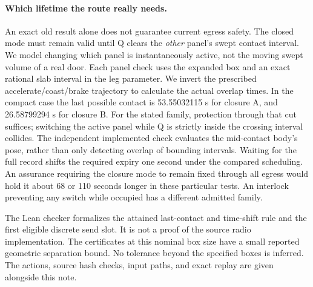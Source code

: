 \documentclass{article}
\begin{document}
\paragraph{Which lifetime the route really needs.}
An exact old result alone does not guarantee current egress
safety. The closed mode must remain valid until Q clears the
\emph{other} panel's swept contact interval. We model changing
which panel is instantaneously active, not the moving swept
volume of a real door. Each panel check uses the expanded
box and an exact rational slab interval in the leg parameter.
We invert the prescribed accelerate/coast/brake trajectory
to calculate the actual overlap times. In the compact case
the last possible contact is 53.55032115 s for closure A,
and 26.58799294 s for closure B. For the stated family,
protection through that cut suffices; switching the active
panel while Q is strictly inside the crossing interval
collides. The independent implemented check evaluates the
mid-contact body's pose, rather than only detecting overlap
of bounding intervals. Waiting for the full record shifts the
required expiry one second under the compared scheduling.
An assurance requiring the closure mode to remain fixed
through all egress would hold it about 68 or 110 seconds
longer in these particular tests. An interlock preventing
any switch while occupied has a different admitted family.

The Lean checker formalizes the attained last-contact and
time-shift rule and the first eligible discrete send slot.
It is not a proof of the source radio implementation.
The certificates at this nominal box size have a small
reported geometric separation bound. No tolerance beyond
the specified boxes is inferred. The actions, source hash
checks, input paths, and exact replay are given alongside
this note.
\end{document}
